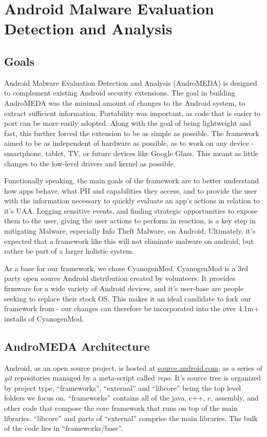 \chapter{Android Malware Evaluation Detection and Analysis}
\label{sec:architecture}

\section{Goals}
Android Malware Evaluation Detection and Analysis (AndroMEDA) is designed to complement existing Android security extensions\citep{All security extensions}. The goal in building AndroMEDA was the minimal amount of changes to the Android system, to extract sufficient information. Portability was important, as code that is easier to port can be more easily adopted. Along with the goal of being lightweight and fast, this further forced the extension to be as simple as possible. The framework aimed to be as independent of hardware as possible, as to work on any device - smartphone, tablet, TV, or future devices like Google Glass. This meant as little changes to the low-level drivers and kernel as possible.

Functionally speaking, the main goals of the framework are to better understand how apps behave, what PII and capabilities they access, and to provide the user with the information necessary to quickly evaluate an app's actions in relation to it's UAA. Logging sensitive events, and finding strategic opportunities to expose them to the user, giving the user actions to perform in reaction, is a key step in mitigating Malware, especially Info Theft Malware, on Android. Ultimately, it's expected that a framework like this will not eliminate malware on android, but rather be part of a larger holistic system.

As a base for our framework, we chose CyanogenMod\citep{cyanogenmod}. CyanogenMod is a 3rd party open source Android distribution created by volunteers. It provides firmware for a wide variety of Android devices, and it's user-base are people seeking to replace their stock OS. This makes it an ideal candidate to fork our framework from - our changes can therefore be incorporated into the over 4.1m+ installs of CyanogenMod\citep{cyanogenmodstats}.

\section{AndroMEDA Architecture}
Android, as an open source project, is hosted at \url{source.android.com}\citep{androidsource}, as a series of \textit{git} repositories managed by a meta-script called \textit{repo}. It's source tree is organized by project type, ``frameworks'', ``external'' and ``libcore'' being the top level folders we focus on. ``frameworks'' contains all of the java, c++, c, assembly, and other code that compose the core framework that runs on top of the main libraries. ``libcore'' and parts of ``external'' comprise the main libraries. The bulk of the code lies in ``frameworks/base''.

